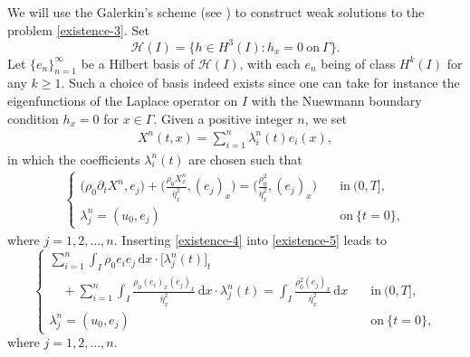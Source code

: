\documentclass[11pt, reqno]{amsart}
\newcommand{\diff}{\mathrm{d}}
\numberwithin{equation}{section}
\begin{document}
{We will use the Galerkin's scheme (see \cite{MR2597943}) to construct weak solutions to  the problem \eqref{existence-3}. Set
\[\mathcal{H}(I)=\{h\in H^3(I): h_x=0 \ \text{on}\ \Gamma\}.\]
Let \(\{e_n\}_{n=1}^\infty\) be a Hilbert basis of \(\mathcal{H}(I)\), with each \(e_n\) being of class \(H^k(I)\) for any \(k\geq 1\).  Such a choice of basis indeed exists since one can take for instance
the eigenfunctions of the Laplace operator on \(I\) with the Nuewmann boundary
condition \(h_x=0\) for \(x\in \Gamma\).
Given a positive integer \(n\), we set
\begin{equation}\label{existence-4}
	\begin{aligned}
		X^n(t,x)=\sum_{i=1}^n\lambda_i^n(t)e_i(x),
	\end{aligned}
\end{equation}
in which the coefficients \(\lambda_i^n(t)\) are chosen such that
\begin{eqnarray}\label{existence-5}
	\begin{cases}
		\big(\rho_0\partial_tX^n,e_j\big)
		+\bigg(\frac{\rho_0X_x^n}{\bar{\eta}_x^2},(e_j)_x\bigg)
		=\bigg(\frac{\rho_0^2}{\bar{\eta}_x^2},(e_j)_x\bigg)
		&\quad \mbox{in}\ (0,T],\\
		\lambda_j^n=(u_0,e_j) &\quad \mbox{on}\ \{t=0\},
	\end{cases}
\end{eqnarray}
where \(j=1,2,...,n\).
Inserting \eqref{existence-4} into \eqref{existence-5} leads to
\begin{equation}\label{existence-6}
	\begin{cases}
		\sum_{i=1}^n\int_I \rho_0 e_ie_j\,\diff x\cdot  [\lambda_j^n(t)\big]_t\\
		\quad+\sum_{i=1}^n\int_I\frac{\rho_0(e_i)_x(e_j)_x}{\bar{\eta}_x^2}\,\diff x\cdot  \lambda_j^n(t)
		=\int_I \frac{\rho_0^2 (e_j)_x}{\bar{\eta}_x^2}\,\diff x	&\quad \mbox{in}\ (0,T],\\
		\lambda_j^n=(u_0,e_j) &\quad \mbox{on}\ \{t=0\},
	\end{cases}
\end{equation}
where \(j=1,2,...,n\).


}
\end{document}
